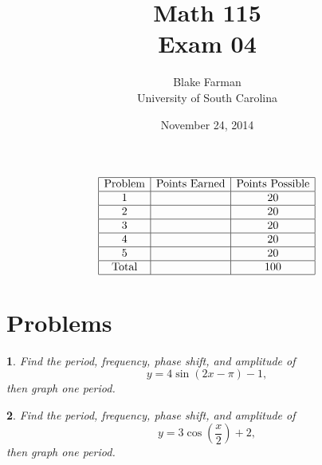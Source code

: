 \documentclass[12pt]{amsart}
\author{Blake Farman\\University of South Carolina}
\title{Math 115\\Exam 04}
\date{November 24, 2014}
\begin{document}
\maketitle

\begin{center}
\end{center}

\vspace{0.2in}
\vspace{0.2in}

$$
\begin{array}{|c|c|c|}
  \hline
  \text{Problem} & \text{Points Earned} & \text{Points Possible}\\
  \hline
  1 & & 20\\
  \hline
  2 & & 20\\
  \hline
  3 & & 20\\
  \hline
  4 & & 20\\
  \hline
  5 & & 20 \\
  \hline
  \text{Total} & & 100\\
  \hline
\end{array}
$$

\newpage

\theoremstyle{plain}
\newtheorem{thm}{}
\newtheorem{lem}{Lemma}
\theoremstyle{definition}
\newtheorem{defn}{Definition}

\section{Problems}

\begin{thm}
  Find the period, frequency, phase shift, and amplitude of $$y = 4\sin(2x - \pi) - 1,$$ then graph one period.
\end{thm}

\newpage

\begin{thm}
  Find the period, frequency, phase shift, and amplitude of $$y = 3\cos\left(\frac{x}{2}\right) + 2,$$ then graph one period.
\end{thm}

\newpage
\end{document}
